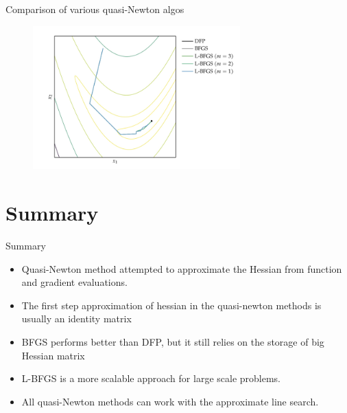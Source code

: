 \documentclass{beamer}
\begin{document}
\begin{frame}{Comparison of various quasi-Newton algos}
\begin{figure}
\centering
\includegraphics[width=80mm]{Figs/quasi-newton.jpeg}
\end{figure}   
\end{frame}


\section{Summary}
\begin{frame}{Summary}
    \begin{itemize}
        \item Quasi-Newton method attempted to approximate the Hessian from function and gradient evaluations.
        \item The first step approximation of hessian in the quasi-newton methods is usually an identity matrix
        \item BFGS performs better than DFP, but it still relies on the storage of big Hessian matrix
        \item L-BFGS is a more scalable approach for large scale problems.
        \item All quasi-Newton methods can work with the approximate line search.
    \end{itemize}
\end{frame}
\end{document}
